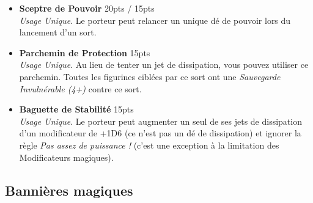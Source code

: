 \begin{multicols}{2}
\begin{itemize}[label={-}]
\item \textbf{Sceptre de Pouvoir} \dotfill \unit{20}{pts} / \unit{15}{pts} \\
\emph{Usage Unique}. Le porteur peut relancer un unique dé de pouvoir lors du lancement d'un sort.

\item \textbf{Parchemin de Protection} \dotfill \unit{15}{pts} \\
\emph{Usage Unique}. Au lieu de tenter un jet de dissipation, vous pouvez utiliser ce parchemin. Toutes les figurines ciblées par ce sort ont une \emph{Sauvegarde Invulnérable (4+)} contre ce sort.

\item \textbf{Baguette de Stabilité} \dotfill \unit{15}{pts} \\
\emph{Usage Unique}. Le porteur peut augmenter un seul de ses jets de dissipation d'un modificateur de +1D6 (ce n'est pas un dé de dissipation) et ignorer la règle \emph{Pas assez de puissance !} (c'est une exception à la limitation des Modificateurs magiques).

\end{itemize}
\end{multicols}

\newpage

\subsection{Bannières magiques}

